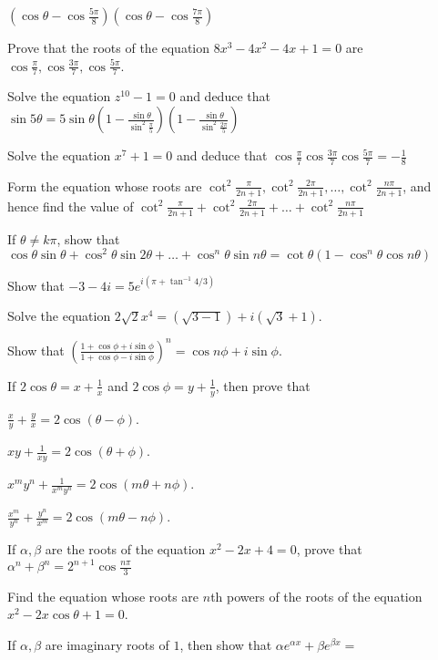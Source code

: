   $\left(\cos\theta - \cos\frac{5\pi}{8}\right)\left(\cos\theta - \cos\frac{7\pi}{8}\right)$
\item Prove that the roots of the equation $8x^3 - 4x^2 - 4x + 1= 0$ are $\cos\frac{\pi}{7}, \cos\frac{3\pi}{7},
  \cos\frac{5\pi}{7}$.
\item Solve the equation $z^{10} - 1 = 0$ and deduce that $\sin5\theta = 5\sin\theta\left(1 -
  \frac{\sin\theta}{\sin^2\frac{\pi}{5}}\right)\left(1 - \frac{\sin\theta}{\sin^2\frac{2\pi}{5}}\right)$
\item Solve the equation $x^7 +1 = 0$ and deduce that $\cos\frac{\pi}{7}\cos\frac{3\pi}{7}\cos\frac{5\pi}{7} = -\frac{1}{8}$
\item Form the equation whose roots are $\cot^2\frac{\pi}{2n + 1}, \cot^2\frac{2\pi}{2n + 1}, \ldots, \cot^2\frac{n\pi}{2n + 1}$,
  and hence find the value of $\cot^2\frac{\pi}{2n + 1} + \cot^2\frac{2\pi}{2n + 1} + \ldots + \cot^2\frac{n\pi}{2n + 1}$
\item If $\theta \neq k\pi$, show that $\cos\theta\sin\theta + \cos^2\theta\sin2\theta + \ldots + \cos^n\theta\sin n\theta =
  \cot\theta(1 - \cos^n\theta\cos n\theta)$
\item Show that $-3 - 4i = 5e^{i(\pi + \tan^{-1}4/3)}$
\item Solve the equation $2\sqrt{2}x^4 = (\sqrt{3 - 1}) + i(\sqrt{3} + 1)$.
\item Show that $\left(\frac{1 + \cos\phi + i\sin\phi}{1 + \cos\phi - i\sin\phi}\right)^n = \cos n\phi + i\sin\phi$.
\item If $2\cos\theta = x + \frac{1}{x}$ and $2\cos\phi = y + \frac{1}{y}$, then prove that
  \startitemize[i]
  \item $\frac{x}{y} + \frac{y}{x} = 2\cos(\theta - \phi)$.
  \item $xy + \frac{1}{xy} = 2\cos(\theta + \phi)$.
  \item $x^my^n + \frac{1}{x^my^n} = 2\cos(m\theta + n\phi)$.
  \item $\frac{x^m}{y^n} + \frac{y^n}{x^m} = 2\cos(m\theta - n\phi)$.
  \stopitemize
\item If $\alpha, \beta$ are the roots of the equation $x^2 - 2x + 4 = 0$, prove that $\alpha^n + \beta^n = 2^{n +
  1}\cos\frac{n\pi}{3}$
\item Find the equation whose roots are $n$th powers of the roots of the equation $x^2 - 2x\cos\theta + 1 = 0$.
\item If $\alpha, \beta$ are imaginary roots of $1$, then show that $\alpha e^{\alpha x} + \beta e^{\beta x} =$

